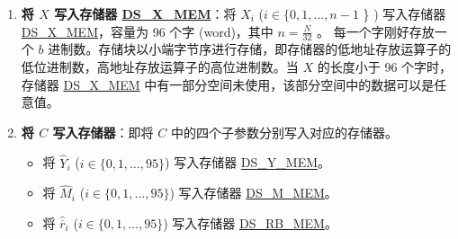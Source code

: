 \documentclass[main\_\_CN.tex]{subfiles}
\begin{document}
\begin{enumerate}
    \item {\bfseries 将 \begin{math}X\end{math} 写入存储器 \hyperref[DSXMEM]{DS\_X\_MEM}}：将 \begin{math}X_{i}\end{math}
        (\begin{math}i \in \{ 0, 1, \dots, n-1 \end{math} \} )
        写入存储器 \hyperref[DSXMEM]{DS\_X\_MEM}，容量为 96 个字 (word)，其中 \begin{math} n = \frac{N}{32} \end{math} 。
        每一个字刚好存放一个 \begin{math}b\end{math} 进制数。存储块以小端字节序进行存储，即存储器的低地址存放运算子的低位进制数，高地址存放运算子的高位进制数。当 \begin{math}X\end{math} 的长度小于 96 个字时，存储器 \hyperref[DSXMEM]{DS\_X\_MEM} 中有一部分空间未使用，该部分空间中的数据可以是任意值。

    \item {\bfseries 将 \begin{math}C\end{math} 写入存储器}：即将 \begin{math}C\end{math} 中的四个子参数分别写入对应的存储器。
    \begin{itemize}

        \item 将 \begin{math}\widehat{Y}_{i}\end{math}
        (\begin{math}i \in \{ 0, 1, \dots, 95 \} \end{math})
        写入存储器 \hyperref[DSYMEM]{DS\_Y\_MEM}。

        \item 将 \begin{math}\widehat{M}_{i}\end{math}
        (\begin{math}i \in \{ 0, 1, \dots, 95 \} \end{math})
        写入存储器 \hyperref[DSMMEM]{DS\_M\_MEM}。

        \item 将 \begin{math}\widehat{\overline{r}}_{i}\end{math}
        (\begin{math}i \in \{ 0, 1, \dots, 95 \} \end{math})
        写入存储器 \hyperref[DSRBMEM]{DS\_RB\_MEM}。


\end{itemize}
\end{enumerate}
\end{document}
